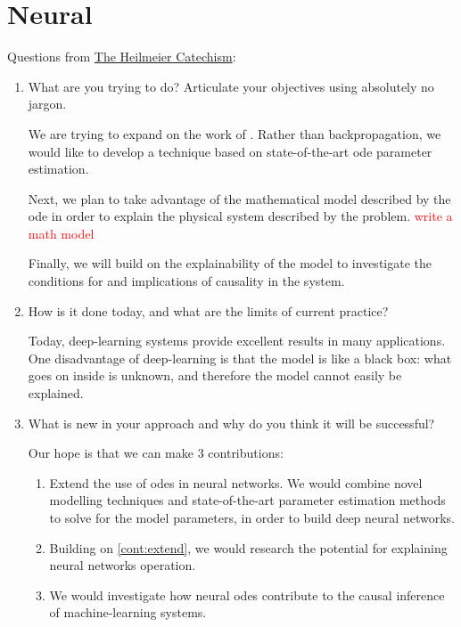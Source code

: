 
\section{Neural }
\label{sec:neural-odes}

Questions from \href{https://www.darpa.mil/work-with-us/heilmeier-catechism}{The Heilmeier Catechism}:

\begin{enumerate}
    \item \label{q:heilmeier-what} What are you trying to do? Articulate your objectives using absolutely no jargon.

    We are trying to expand on the work of \cite{chen2018neural}.
    Rather than backpropagation,
    we would like to develop a technique based on state-of-the-art \gls{ode} parameter estimation.

    Next,
    we plan to take advantage of the mathematical model described by the \gls{ode} in order to explain the physical system described by the problem. \textcolor{red}{write a math model}

    Finally, we will build on the explainability of the model to investigate the conditions for and implications of causality in the system.

    \item \label{q:heilmeier-today} How is it done today, and what are the limits of current practice?

    Today,
    deep-learning systems provide excellent results in many applications.
    One disadvantage of deep-learning is that the model is like a black box:
    what goes on inside is unknown,
    and therefore the model cannot easily be explained.

    \item \label{q:heilmeier-new} What is new in your approach and why do you think it will be successful?

    Our hope is that we can make 3 contributions:
    \begin{enumerate}
        \item\label{cont:extend} Extend the use of \glspl{ode} in neural networks.
        We would combine novel modelling techniques and state-of-the-art parameter estimation methods to solve for the model parameters,
        in order to build deep neural networks.
        \item\label{cont:explain} Building on \cref{cont:extend},
        we would research the potential for explaining neural networks operation.
        \item\label{cont:causality} We would investigate how neural \glspl{ode} contribute to the causal inference of machine-learning systems.
    \end{enumerate}


\end{enumerate}
